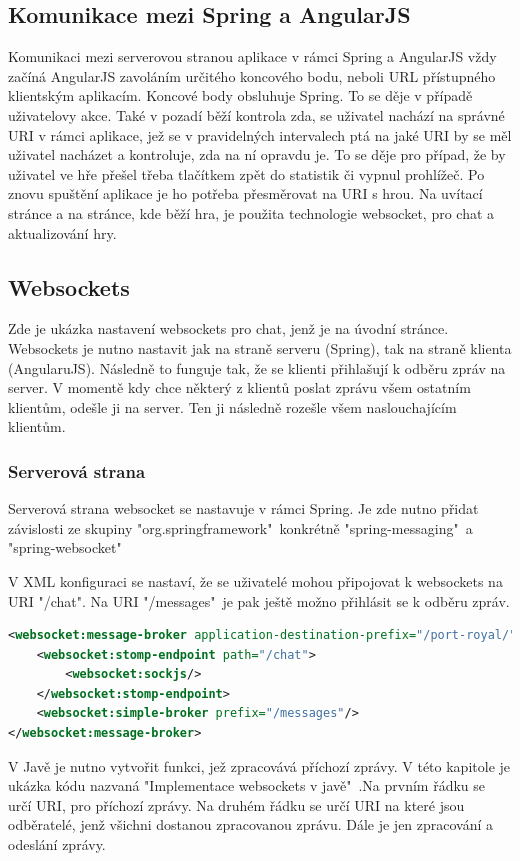 \documentclass[czech,master,public,dept460,male,cpdeclaration,twoside]{diploma}
\begin{document}
\subsection{Komunikace mezi Spring a AngularJS}
Komunikaci mezi serverovou stranou aplikace v rámci Spring a AngularJS vždy začíná AngularJS zavoláním určitého koncového bodu, neboli URL přístupného klientským aplikacím. Koncové body obsluhuje Spring. To se děje v případě uživatelovy akce. Také v pozadí běží kontrola zda, se uživatel nachází na správné URI v rámci aplikace, jež se v pravidelných intervalech ptá na jaké URI by se měl uživatel nacházet a kontroluje, zda na ní opravdu je. To se děje pro případ, že by uživatel ve hře přešel třeba tlačítkem zpět do statistik či vypnul prohlížeč. Po znovu spuštění aplikace je ho potřeba přesměrovat na URI s hrou. Na uvítací stránce a na stránce, kde běží hra, je použita technologie websocket, pro chat a aktualizování hry.

\subsection{Websockets}
Zde je ukázka nastavení websockets pro chat, jenž je na úvodní stránce. Websockets je nutno nastavit jak na straně serveru (Spring), tak na straně klienta (AngularuJS). Následně to funguje tak, že se klienti přihlašují k odběru zpráv na server. V momentě kdy chce některý z klientů poslat zprávu všem ostatním klientům, odešle ji na server. Ten ji následně rozešle všem naslouchajícím klientům. \cite{websoc}
\subsubsection{Serverová strana}
Serverová strana websocket se nastavuje v rámci Spring. Je zde nutno přidat závislosti ze skupiny "org.springframework"~konkrétně "spring-messaging"~a "spring-websocket"

V XML konfiguraci se nastaví, že se uživatelé mohou připojovat k websockets na URI "/chat". Na URI "/messages"~je pak ještě možno přihlásit se k odběru zpráv.
\begin{lstlisting}[language=XML, caption=XML konfigurace websockets]
<websocket:message-broker application-destination-prefix="/port-royal/">
    <websocket:stomp-endpoint path="/chat">
        <websocket:sockjs/>
    </websocket:stomp-endpoint>
    <websocket:simple-broker prefix="/messages"/>
</websocket:message-broker>
\end{lstlisting}

V Javě je nutno vytvořit funkci, jež zpracovává příchozí zprávy. V této kapitole je ukázka kódu nazvaná "Implementace websockets v javě"~.Na prvním řádku se určí URI, pro příchozí zprávy. Na druhém řádku se určí URI na které jsou odběratelé, jenž všichni dostanou zpracovanou zprávu. Dále je jen zpracování a odeslání zprávy.\\
\end{document}
